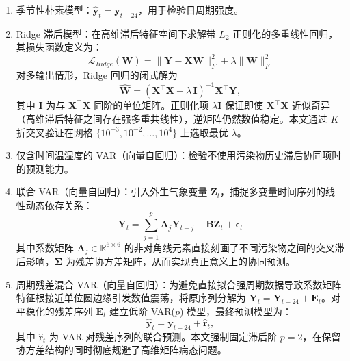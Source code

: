 \documentclass[UTF8,a4paper,12pt]{ctexart}
\begin{document}
\begin{enumerate}
  \item 季节性朴素模型：$\hat{\mathbf{y}}_t=\mathbf{y}_{t-24}$，用于检验日周期强度。
  
  \item Ridge 滞后模型：在高维滞后特征空间下求解带 $L_2$ 正则化的多重线性回归，其损失函数定义为：
  \begin{equation}
  \label{eq:ridge_loss}
    \mathcal{L}_{Ridge}(\mathbf{W}) = \|\mathbf{Y} - \mathbf{X}\mathbf{W}\|_F^2 + \lambda \|\mathbf{W}\|_F^2
  \end{equation}
  对多输出情形，Ridge 回归的闭式解为
  \begin{equation}
  \label{eq:ridge_solution}
  \hat{\mathbf{W}}=\left(\mathbf{X}^\top\mathbf{X}+\lambda\,\mathbf{I}\right)^{-1}\mathbf{X}^\top\mathbf{Y},
  \end{equation}
  其中 $\mathbf{I}$ 为与 $\mathbf{X}^\top\mathbf{X}$ 同阶的单位矩阵。正则化项 $\lambda\mathbf{I}$ 保证即使 $\mathbf{X}^\top\mathbf{X}$ 近似奇异（高维滞后特征之间存在强多重共线性），逆矩阵仍然数值稳定。本文通过 $K$ 折交叉验证在网格 $\{10^{-3},10^{-2},\ldots,10^{4}\}$ 上选取最优 $\lambda$。
  
  \item 仅含时间温湿度的 VAR（向量自回归）：检验不使用污染物历史滞后协同项时的预测能力。
  
  \item 联合 VAR（向量自回归）：引入外生气象变量 $\mathbf{Z}_t$，捕捉多变量时间序列的线性动态依存关系：
  \begin{equation}
  \label{eq:varx}
    \mathbf{Y}_t = \sum_{j=1}^{p} \mathbf{A}_j \mathbf{Y}_{t-j} + \mathbf{B} \mathbf{Z}_t + \boldsymbol{\epsilon}_t
  \end{equation}
  其中系数矩阵 $\mathbf{A}_j \in \mathbb{R}^{6 \times 6}$ 的非对角线元素直接刻画了不同污染物之间的交叉滞后影响，$\boldsymbol{\Sigma}$ 为残差协方差矩阵，从而实现真正意义上的协同预测。
  
  \item 周期残差混合 VAR（向量自回归）：为避免直接拟合强周期数据导致系数矩阵特征根接近单位圆边缘引发数值震荡，将原序列分解为 $\mathbf{Y}_t = \mathbf{Y}_{t-24} + \mathbf{E}_t$。对平稳化的残差序列 $\mathbf{E}_t$ 建立低阶 VAR($p$) 模型，最终预测模型为：
  \begin{equation}
  \label{eq:hybrid_var}
    \hat{\mathbf{y}}_t=\mathbf{y}_{t-24}+\hat{\mathbf{r}}_t,
  \end{equation}
  其中 $\hat{\mathbf{r}}_t$ 为 VAR 对残差序列的联合预测。本文强制固定滞后阶 $p=2$，在保留协方差结构的同时彻底规避了高维矩阵病态问题。
  

\end{enumerate}
\end{document}
